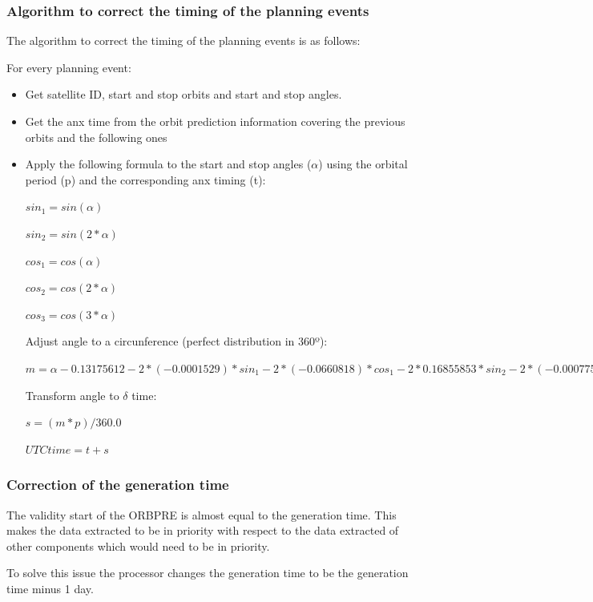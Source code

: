 \subsubsection{Algorithm to correct the timing of the planning events}

The algorithm to correct the timing of the planning events is as follows:

For every planning event:

\begin{itemize} 

\item Get satellite ID, start and stop orbits and start and stop angles.

\item Get the \acrshort{anx} time from the orbit prediction information covering the previous orbits and the following ones

\item Apply the following formula to the start and stop angles (\(\alpha\)) using the orbital period (p) and the corresponding \acrshort{anx} timing (t):

  \(sin_1 = sin(\alpha)\)

  \(sin_2 = sin(2*\alpha)\)

  \(cos_1 = cos(\alpha)\)

  \(cos_2 = cos(2*\alpha)\)

  \(cos_3 = cos(3*\alpha)\)

  Adjust angle to a circunference (perfect distribution in 360º):
  
  \(m = \alpha - 0.13175612 - 2*(-0.0001529)*sin_1 - 2*(-0.0660818)*cos_1 - 2*0.16855853*sin_2 - 2*(-0.0007759)*cos_2 - 2*0.0009872*cos_3 - 2*0.00687159*sin_2\)

  Transform angle to \(\delta\) time:
  
  \(s = (m * p)/360.0\)

  \(UTC time = t + s \)
  
\end{itemize}

\subsubsection{Correction of the generation time}

The validity start of the ORBPRE is almost equal to the generation time. This makes the data extracted to be in priority with respect to the data extracted of other components which would need to be in priority.

To solve this issue the processor changes the generation time to be the generation time minus 1 day.
